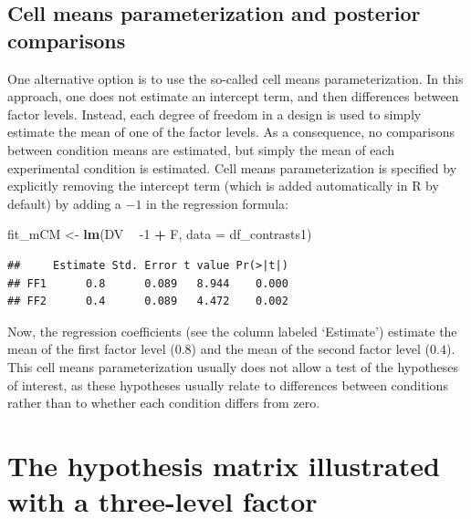 \documentclass[12pt,]{krantz}
\newenvironment{Shaded}{\begin{snugshade}}{\end{snugshade}}
\newcommand{\DataTypeTok}[1]{\textcolor[rgb]{0.13,0.29,0.53}{#1}}
\newcommand{\DecValTok}[1]{\textcolor[rgb]{0.00,0.00,0.81}{#1}}
\newcommand{\KeywordTok}[1]{\textcolor[rgb]{0.13,0.29,0.53}{\textbf{#1}}}
\newcommand{\NormalTok}[1]{#1}
\newcommand{\OperatorTok}[1]{\textcolor[rgb]{0.81,0.36,0.00}{\textbf{#1}}}
\newcommand{\StringTok}[1]{\textcolor[rgb]{0.31,0.60,0.02}{#1}}
\begin{document}
\hypertarget{sec:cellMeans}{%
\subsection{Cell means parameterization and posterior comparisons}\label{sec:cellMeans}}

One alternative option is to use the so-called cell means parameterization. In this approach, one does not estimate an intercept term, and then differences between factor levels. Instead, each degree of freedom in a design is used to simply estimate the mean of one of the factor levels. As a consequence, no comparisons between condition means are estimated, but simply the mean of each experimental condition is estimated. Cell means parameterization is specified by explicitly removing the intercept term (which is added automatically in R by default) by adding a \(-1\) in the regression formula:

\begin{Shaded}
\begin{Highlighting}[]
\NormalTok{fit_mCM <-}\StringTok{ }\KeywordTok{lm}\NormalTok{(DV }\OperatorTok{~}\StringTok{ }\DecValTok{-1} \OperatorTok{+}\StringTok{ }\NormalTok{F,}
                 \DataTypeTok{data =}\NormalTok{ df_contrasts1) }
\end{Highlighting}
\end{Shaded}

\begin{Shaded}
\end{Shaded}

\begin{verbatim}
##     Estimate Std. Error t value Pr(>|t|)
## FF1      0.8      0.089   8.944    0.000
## FF2      0.4      0.089   4.472    0.002
\end{verbatim}

Now, the regression coefficients (see the column labeled `Estimate') estimate the mean of the first factor level (\(0.8\)) and the mean of the second factor level (\(0.4\)). This cell means parameterization usually does not allow a test of the hypotheses of interest, as these hypotheses usually relate to differences between conditions rather than to whether each condition differs from zero.

\hypertarget{the-hypothesis-matrix-illustrated-with-a-three-level-factor}{%
\section{The hypothesis matrix illustrated with a three-level factor}\label{the-hypothesis-matrix-illustrated-with-a-three-level-factor}}
\end{document}
